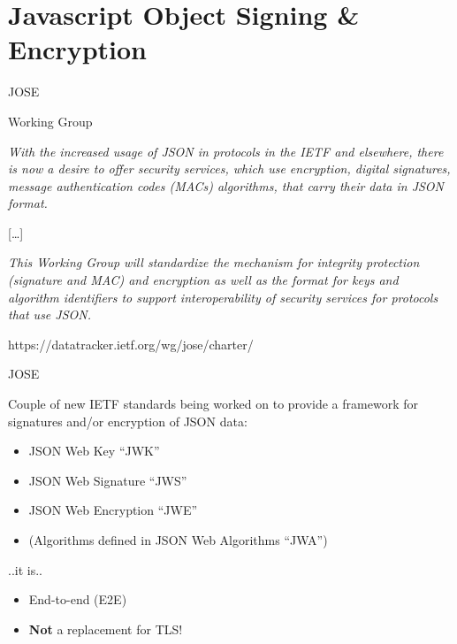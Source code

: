 \section{Javascript Object Signing \&
Encryption}\label{javascript-object-signing-encryption}

\begin{frame}{JOSE}

\begin{block}{Working Group}

\emph{With the increased usage of JSON in protocols in the IETF and
elsewhere, there is now a desire to offer security services, which use
encryption, digital signatures, message authentication codes (MACs)
algorithms, that carry their data in JSON format.}

{[}\ldots{}{]}

\emph{This Working Group will standardize the mechanism for integrity
protection (signature and MAC) and encryption as well as the format for
keys and algorithm identifiers to support interoperability of security
services for protocols that use JSON.}

https://datatracker.ietf.org/wg/jose/charter/

\end{block}

\end{frame}

\begin{frame}{JOSE}

Couple of new IETF standards being worked on to provide a framework for
signatures and/or encryption of JSON data:

\begin{itemize}
\itemsep1pt\parskip0pt
\item
  JSON Web Key ``JWK''
\item
  JSON Web Signature ``JWS''
\item
  JSON Web Encryption ``JWE''
\item
  (Algorithms defined in JSON Web Algorithms ``JWA'')
\end{itemize}

..it is..

\begin{itemize}
\itemsep1pt\parskip0pt
\item
  End-to-end (E2E)
\item
  \textbf{Not} a replacement for TLS!
\end{itemize}

\end{frame}

